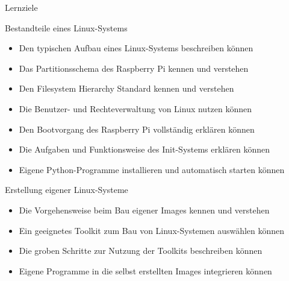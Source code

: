\begin{frame}{Lernziele}
    \begin{block}{Bestandteile eines Linux-Systems}
        \begin{itemize}
            \item Den typischen Aufbau eines Linux-Systems beschreiben können
            \item Das Partitionsschema des Raspberry Pi kennen und verstehen
            \item Den Filesystem Hierarchy Standard kennen und verstehen
            \item Die Benutzer- und Rechteverwaltung von Linux nutzen können
            \item Den Bootvorgang des Raspberry Pi vollständig erklären können
            \item Die Aufgaben und Funktionsweise des Init-Systems erklären können
            \item Eigene Python-Programme installieren und automatisch starten können
        \end{itemize}
    \end{block}

    \begin{block}{Erstellung eigener Linux-Systeme}
        \begin{itemize}
            \item Die Vorgehensweise beim Bau eigener Images kennen und verstehen
            \item Ein geeignetes Toolkit zum Bau von Linux-Systemen auswählen können
            \item Die groben Schritte zur Nutzung der Toolkits beschreiben können
            \item Eigene Programme in die selbst erstellten Images integrieren können
        \end{itemize}
    \end{block}
\end{frame}

